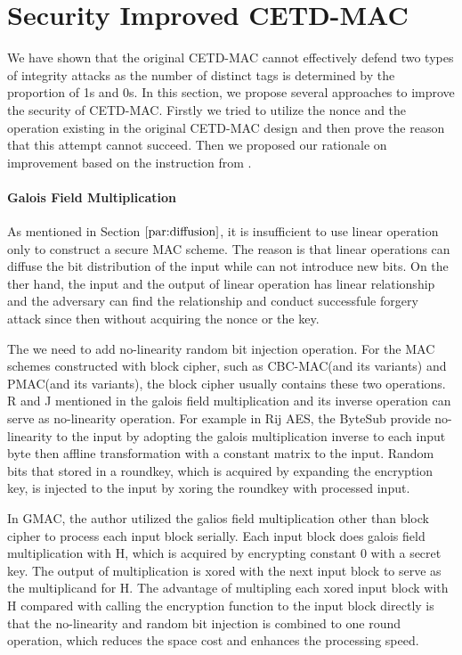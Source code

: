 \section{Security Improved CETD-MAC}
We have shown that the original CETD-MAC cannot effectively defend two types of integrity attacks as the number of distinct tags is determined by the proportion of 1s and 0s. In this section, we propose several approaches to improve the security of CETD-MAC. Firstly we tried to utilize the nonce and the operation existing in the original CETD-MAC design and then prove the reason that this attempt cannot succeed. Then we proposed our rationale on improvement based on the instruction from \cite{}.  

\paragraph{Galois Field Multiplication}
As mentioned in Section $\ref{par:diffusion}$, it is insufficient to use linear operation
only to construct a secure MAC scheme. The reason is that linear operations can
diffuse the bit distribution of the input while can not introduce new bits. On
the ther hand, the input and the output of linear operation has linear
relationship and the adversary can find the relationship and conduct successfule
forgery attack since then without acquiring the nonce or the key.

The we need to add no-linearity random bit injection operation. For the MAC
schemes constructed with block cipher, such as CBC-MAC(and its variants) and
PMAC(and its variants), the block cipher usually contains these two operations.
R and J mentioned in \cite{} the galois field multiplication and its inverse
operation can serve as no-linearity operation. 
For example in Rij AES, the ByteSub provide no-linearity to the input by
adopting the galois multiplication inverse to each input byte then affline
transformation with a constant matrix to the input. Random bits that stored in a
roundkey, which is acquired by expanding the encryption key, is injected to the
input by xoring the roundkey with processed input.  

In GMAC, the author utilized the galios field multiplication other than block
cipher to process each input block serially. Each input block does galois field
multiplication with H, which is acquired by encrypting constant 0 with a secret
key. The output of multiplication is xored with the next input block to serve as
the multiplicand for H. The advantage of multipling each xored input block with
H compared with calling the encryption function to the input block directly is
that the no-linearity and random bit injection is combined to one round
operation, which reduces the space cost and enhances the processing speed.

